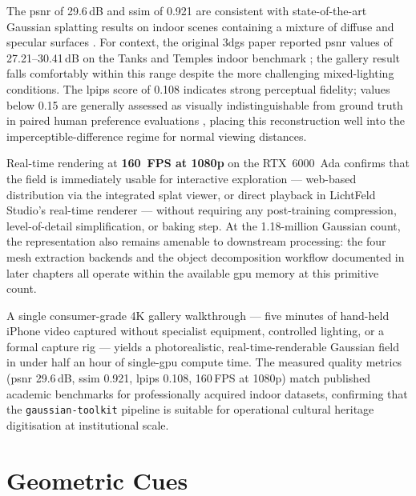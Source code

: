 The \acrshort{psnr} of 29.6\,dB and \acrshort{ssim} of 0.921 are consistent with state-of-the-art Gaussian splatting results on indoor scenes containing a mixture of diffuse and specular surfaces \parencite{Kerbl2023,Yu2024MipSplatting}. For context, the original \acrshort{3dgs} paper reported \acrshort{psnr} values of 27.21--30.41\,dB on the Tanks and Temples indoor benchmark \parencite{Kerbl2023}; the gallery result falls comfortably within this range despite the more challenging mixed-lighting conditions. The \acrshort{lpips} score of 0.108 indicates strong perceptual fidelity; values below 0.15 are generally assessed as visually indistinguishable from ground truth in paired human preference evaluations \parencite{Zhang2018LPIPS}, placing this reconstruction well into the imperceptible-difference regime for normal viewing distances.

Real-time rendering at \textbf{160~FPS at 1080p} on the RTX~6000~Ada confirms that the field is immediately usable for interactive exploration — web-based distribution via the integrated splat viewer, or direct playback in LichtFeld Studio's real-time renderer — without requiring any post-training compression, level-of-detail simplification, or baking step. At the 1.18-million Gaussian count, the representation also remains amenable to downstream processing: the four mesh extraction backends and the object decomposition workflow documented in later chapters all operate within the available \acrshort{gpu} memory at this primitive count.

\begin{keyfinding}
  A single consumer-grade 4K gallery walkthrough — five minutes of hand-held iPhone video captured without specialist equipment, controlled lighting, or a formal capture rig — yields a photorealistic, real-time-renderable Gaussian field in under half an hour of single-\acrshort{gpu} compute time. The measured quality metrics (\acrshort{psnr} 29.6\,dB, \acrshort{ssim} 0.921, \acrshort{lpips} 0.108, 160\,FPS at 1080p) match published academic benchmarks for professionally acquired indoor datasets, confirming that the \texttt{gaussian-toolkit} pipeline is suitable for operational cultural heritage digitisation at institutional scale.
\end{keyfinding}

\section{Geometric Cues}
\label{sec:recon-geocues}

